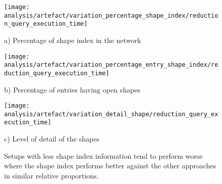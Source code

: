 \begin{figure}[htbp]
    \centering
    \begin{minipage}[t]{0.33\textwidth}
        \centering
        \texttt{[image: analysis/artefact/variation\_percentage\_shape\_index/reduction\_query\_execution\_time]}
        \caption*{a) Percentage of shape index in the network}
        \label{fig:varPercentShapeIndex}
    \end{minipage}%
    \begin{minipage}[t]{0.33\textwidth}
        \centering
        \texttt{[image: analysis/artefact/variation\_percentage\_entry\_shape\_index/reduction\_query\_execution\_time]}
        \caption*{b) Percentage of entries having open shapes}
        \label{fig:varPercentEntries}
    \end{minipage}%
    \begin{minipage}[t]{0.33\textwidth}
        \centering
        \texttt{[image: analysis/artefact/variation\_detail\_shape/reduction\_query\_execution\_time]}
        \caption*{c) Level of detail of the shapes}
        \label{fig:varShapeDetail}
    \end{minipage}

    \caption{Setups with less shape index information tend to perform worse where the shape index performs
    better against the other approaches in similar relative proportions.}
    \label{fig:adaptShapeIndex}
\end{figure}


